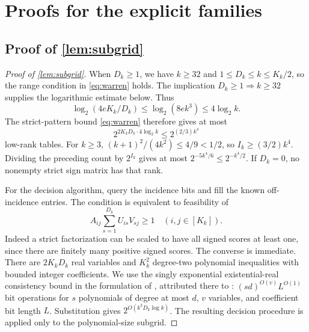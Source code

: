 \section{Proofs for the explicit families}\label{app:proofs-D}

\subsection[Proof of result subgrid]{Proof of \cref{lem:subgrid}}\label{proof:subgrid}
\begin{proof}[Proof of \cref{lem:subgrid}]
When $D_k\ge1$, we have $k\ge32$ and $1\le D_k\le k\le K_k/2$, so the range condition in \eqref{eq:warren} holds. The implication $D_k\ge1\Rightarrow k\ge32$ supplies the logarithmic estimate below. Thus
\[
 \log_2(4eK_k/D_k)\le\log_2(8e k^3)\le4\log_2k.
\]
The strict-pattern bound \eqref{eq:warren} therefore gives at most
\[
 2^{2K_kD_k\cdot4\log_2k}\le2^{(2/3)k^4}
\]
low-rank tables. For $k\ge3$, $(k+1)^2/(4k^2)\le4/9<1/2$, so $I_k\ge(3/2)k^4$. Dividing the preceding count by $2^{I_k}$ gives at most $2^{-5k^4/6}\le2^{-k^4/2}$. If $D_k=0$, no nonempty strict sign matrix has that rank.

For the decision algorithm, query the incidence bits and fill the known off-incidence entries. The condition is equivalent to feasibility of
\[
 A_{ij}\sum_{s=1}^{D_k}U_{is}V_{sj}\ge1\quad(i,j\in[K_k]).
\]
Indeed a strict factorization can be scaled to have all signed scores at least one, since there are finitely many positive signed scores. The converse is immediate. There are $2K_kD_k$ real variables and $K_k^2$ degree-two polynomial inequalities with bounded integer coefficients. We use the singly exponential existential-real consistency bound in the formulation of \citet{Vorobjov21}, attributed there to \citet{Renegar92,Renegar92II,Renegar92III}: $(sd)^{O(v)}L^{O(1)}$ bit operations for $s$ polynomials of degree at most $d$, $v$ variables, and coefficient bit length $L$. Substitution gives $2^{O(k^3D_k\log k)}$. The resulting decision procedure is applied only to the polynomial-size subgrid.
\end{proof}

